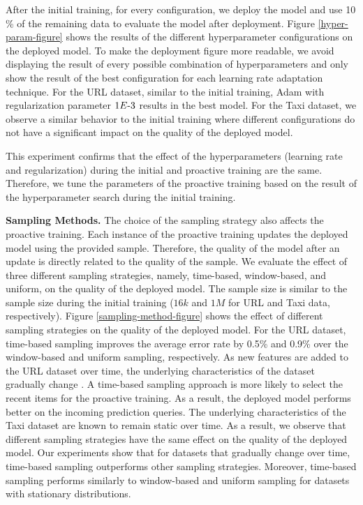 After the initial training, for every configuration, we deploy the model and use 10 \% of the remaining data to evaluate the model after deployment.
Figure \ref{hyper-param-figure} shows the results of the different hyperparameter configurations on the deployed model.
To make the deployment figure more readable, we avoid displaying the result of every possible combination of hyperparameters and only show the result of the best configuration for each learning rate adaptation technique.
For the URL dataset, similar to the initial training, Adam with regularization parameter $1E{\text -}3$ results in the best model.
For the Taxi dataset, we observe a similar behavior to the initial training where different configurations do not have a significant impact on the quality of the deployed model.

This experiment confirms that the effect of the hyperparameters (learning rate and regularization) during the initial and proactive training are the same.
Therefore, we tune the parameters of the proactive training based on the result of the hyperparameter search during the initial training.

\textbf{Sampling Methods.}
The choice of the sampling strategy also affects the proactive training.
Each instance of the proactive training updates the deployed model using the provided sample.
Therefore, the quality of the model after an update is directly related to the quality of the sample.
We evaluate the effect of three different sampling strategies, namely, time-based, window-based, and uniform, on the quality of the deployed model.
The sample size is similar to the sample size during the initial training ($16k$ and $1M$ for URL and Taxi data, respectively).
Figure \ref{sampling-method-figure} shows the effect of different sampling strategies on the quality of the deployed model.
For the URL dataset, time-based sampling improves the average error rate by 0.5\% and 0.9\% over the window-based and uniform sampling, respectively.
As new features are added to the URL dataset over time, the underlying characteristics of the dataset gradually change \cite{ma2009identifying}.
A time-based sampling approach is more likely to select the recent items for the proactive training.
As a result, the deployed model performs better on the incoming prediction queries.
The underlying characteristics of the Taxi dataset are known to remain static over time.
As a result, we observe that different sampling strategies have the same effect on the quality of the deployed model.
Our experiments show that for datasets that gradually change over time, time-based sampling outperforms other sampling strategies.
Moreover, time-based sampling performs similarly to window-based and uniform sampling for datasets with stationary distributions.
